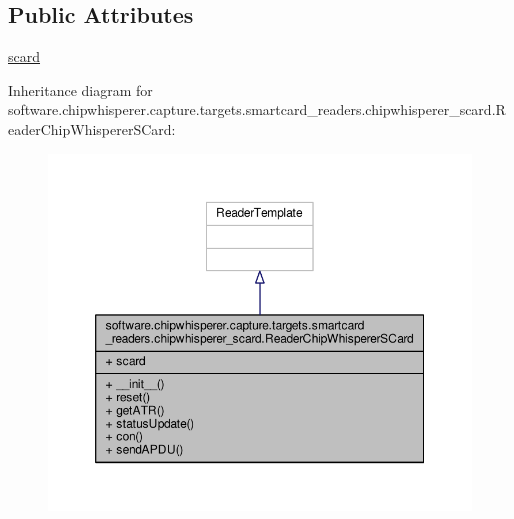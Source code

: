 \subsection*{Public Attributes}
\begin{DoxyCompactItemize}
\item 
\hyperlink{classsoftware_1_1chipwhisperer_1_1capture_1_1targets_1_1smartcard__readers_1_1chipwhisperer__scard_1_1ReaderChipWhispererSCard_a331e48d4b114ab186054418d646e68aa}{scard}
\end{DoxyCompactItemize}


Inheritance diagram for software.\+chipwhisperer.\+capture.\+targets.\+smartcard\+\_\+readers.\+chipwhisperer\+\_\+scard.\+Reader\+Chip\+Whisperer\+S\+Card\+:\nopagebreak
\begin{figure}[H]
\begin{center}
\leavevmode
\includegraphics[width=350pt]{d0/d4a/classsoftware_1_1chipwhisperer_1_1capture_1_1targets_1_1smartcard__readers_1_1chipwhisperer__scaa75afaf110c71cc7681d60a5e3e0e38b}
\end{center}
\end{figure}


